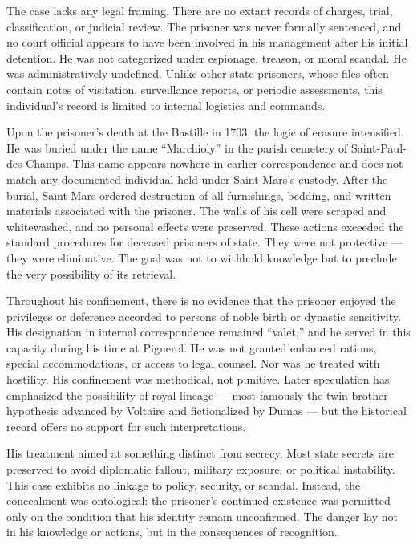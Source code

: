 The case lacks any legal framing. There are no extant records of charges, trial, classification, or judicial review. The prisoner was never formally sentenced, and no court official appears to have been involved in his management after his initial detention. He was not categorized under espionage, treason, or moral scandal. He was administratively undefined. Unlike other state prisoners, whose files often contain notes of visitation, surveillance reports, or periodic assessments, this individual's record is limited to internal logistics and commands.

Upon the prisoner’s death at the Bastille in 1703, the logic of erasure intensified. He was buried under the name “Marchioly” in the parish cemetery of Saint-Paul-des-Champs. This name appears nowhere in earlier correspondence and does not match any documented individual held under Saint-Mars’s custody. After the burial, Saint-Mars ordered destruction of all furnishings, bedding, and written materials associated with the prisoner. The walls of his cell were scraped and whitewashed, and no personal effects were preserved. These actions exceeded the standard procedures for deceased prisoners of state. They were not protective — they were eliminative. The goal was not to withhold knowledge but to preclude the very possibility of its retrieval.

Throughout his confinement, there is no evidence that the prisoner enjoyed the privileges or deference accorded to persons of noble birth or dynastic sensitivity. His designation in internal correspondence remained “valet,” and he served in this capacity during his time at Pignerol. He was not granted enhanced rations, special accommodations, or access to legal counsel. Nor was he treated with hostility. His confinement was methodical, not punitive. Later speculation has emphasized the possibility of royal lineage — most famously the twin brother hypothesis advanced by Voltaire and fictionalized by Dumas — but the historical record offers no support for such interpretations.

His treatment aimed at something distinct from secrecy. Most state secrets are preserved to avoid diplomatic fallout, military exposure, or political instability. This case exhibits no linkage to policy, security, or scandal. Instead, the concealment was ontological: the prisoner's continued existence was permitted only on the condition that his identity remain unconfirmed. The danger lay not in his knowledge or actions, but in the consequences of recognition.

